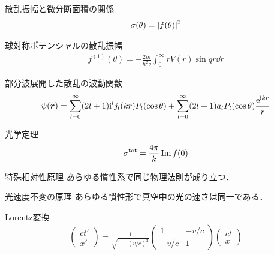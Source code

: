 \documentclass{report}
\begin{document}
\begin{itembox}[l]{散乱振幅と微分断面積の関係}
  \begin{align}
    \sigma(\theta) = \abs{f(\theta)}^2
  \end{align}
\end{itembox}

\begin{itembox}[l]{球対称ポテンシャルの散乱振幅}
  \begin{align}
    \label{SCamp1st}
    f^{(1)}(\theta) =  -\frac{2m}{\hbar^2 q} \int_{0}^{\infty} rV(r)\sin qr \dd{r}
  \end{align}
\end{itembox}

\begin{itembox}[l]{部分波展開した散乱の波動関数}
  \begin{align}
    \label{PartialWave}
    \psi(\bm{r}) = \sum_{l=0}^{\infty} (2l+1)\mathrm{i}^l j_l(kr)P_l(\cos\theta) + \sum_{l=0}^{\infty} (2l+1)a_l P_l(\cos\theta) \frac{\mathrm{e}^{\mathrm{i} kr}}{r}
  \end{align}
\end{itembox}

  \begin{itembox}[l]{光学定理}
    \begin{align}
      \sigma^{\mathrm{tot}} = \frac{4\pi}{k} \Im f(0)
    \end{align}
  \end{itembox}

  \begin{itembox}[l]{特殊相対性原理}
    あらゆる慣性系で同じ物理法則が成り立つ．
  \end{itembox}

  \begin{itembox}[l]{光速度不変の原理}
    あらゆる慣性形で真空中の光の速さは同一である．
  \end{itembox}

  \begin{itembox}[l]{Lorentz変換}
    \begin{align}
      \begin{pmatrix}
        ct' \\ x'
      \end{pmatrix}
      =
      \frac{1}{\sqrt{1 - (v/c)^2}}
      \begin{pmatrix}
        1 & -v/c\\
        -v/c & 1
      \end{pmatrix}
      \begin{pmatrix}
        ct\\x
      \end{pmatrix}
    \end{align}
  \end{itembox}
\end{document}
